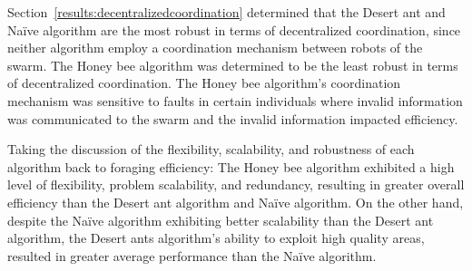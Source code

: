 Section~\ref{results:decentralizedcoordination} determined that the Desert ant and Na\"ive algorithm are the most robust in terms of decentralized coordination, since neither algorithm employ a coordination mechanism between robots of the swarm. The Honey bee algorithm was determined to be the least robust in terms of decentralized coordination. The Honey bee algorithm's coordination mechanism was sensitive to faults in certain individuals where invalid information was communicated to the swarm and the invalid information impacted efficiency.

Taking the discussion of the flexibility, scalability, and robustness of each algorithm back to foraging efficiency: The Honey bee algorithm exhibited a high level of flexibility, problem scalability, and redundancy, resulting in greater overall efficiency than the Desert ant algorithm and Na\"ive algorithm. On the other hand, despite the Na\"ive algorithm exhibiting better scalability than the Desert ant algorithm, the Desert ants algorithm's ability to exploit high quality areas, resulted in greater average performance than the Na\"ive algorithm.

